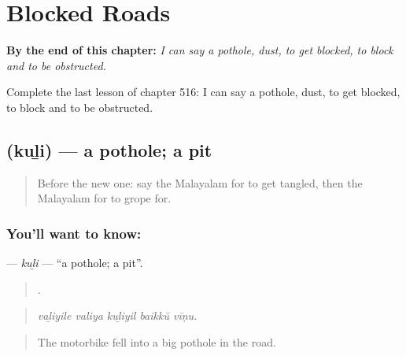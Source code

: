 
\chapter{Blocked Roads}
\label{ch:ml-blocked-roads}

\begin{chapteropening}
\textbf{By the end of this chapter:} \emph{I can say a pothole, dust, to get blocked, to block and to be obstructed.}

Complete the last lesson of chapter 516: I can say a pothole, dust, to get blocked, to block and to be obstructed.
\end{chapteropening}

\section[\texorpdfstring{\ml{കുഴി} (kuḻi)}{കുഴി (kuḻi)}]{ (kuḻi) — a pothole; a pit}

\label{lesson:ML-C516-kuli}



\begin{quote}
Before the new one: say the Malayalam for to get tangled, then the Malayalam for to grope for.
\end{quote}

\subsection*{You'll want to know: }
\textbf{} — \emph{kuḻi} — \textquotedblleft{}a pothole; a pit\textquotedblright{}.

\begin{quote}
    .
\end{quote}

\begin{quote}
\emph{vaḻiyile valiya kuḻiyil baikkŭ vīṇu.}
\end{quote}

\begin{quote}
The motorbike fell into a big pothole in the road.
\end{quote}

